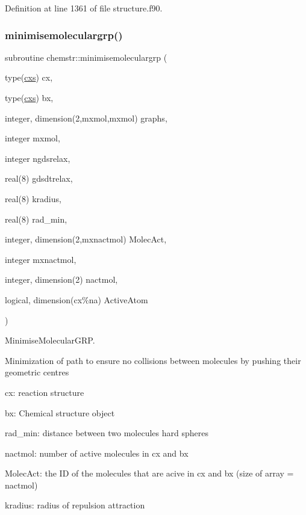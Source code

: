 Definition at line 1361 of file structure.\+f90.

\mbox{\label{namespacechemstr_a2134606948b8e1c9fcf97b48bfe34ec2}} 
\subsubsection{\texorpdfstring{minimisemoleculargrp()}{minimisemoleculargrp()}}
{\footnotesize\ttfamily subroutine chemstr\+::minimisemoleculargrp (\begin{DoxyParamCaption}\item[{type(\mbox{\hyperlink{structchemstr_1_1cxs}{cxs}})}]{cx,  }\item[{type(\mbox{\hyperlink{structchemstr_1_1cxs}{cxs}})}]{bx,  }\item[{integer, dimension(2,mxmol,mxmol)}]{graphs,  }\item[{integer}]{mxmol,  }\item[{integer}]{ngdsrelax,  }\item[{real(8)}]{gdsdtrelax,  }\item[{real(8)}]{kradius,  }\item[{real(8)}]{rad\+\_\+min,  }\item[{integer, dimension(2,mxnactmol)}]{Molec\+Act,  }\item[{integer}]{mxnactmol,  }\item[{integer, dimension(2)}]{nactmol,  }\item[{logical, dimension(cx\%na)}]{Active\+Atom }\end{DoxyParamCaption})}



Minimise\+Molecular\+G\+RP. 

Minimization of path to ensure no collisions between molecules by pushing their geometric centres


\begin{DoxyItemize}
\item cx\+: reaction structure
\item bx\+: Chemical structure object
\item rad\+\_\+min\+: distance between two molecules hard spheres
\item nactmol\+: number of active molecules in cx and bx
\item Molec\+Act\+: the ID of the molecules that are acive in cx and bx (size of array = nactmol)
\item kradius\+: radius of repulsion attraction 
\end{DoxyItemize}

